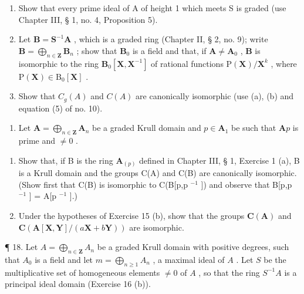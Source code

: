 \begin{enumerate}
\def\labelenumi{(\alph{enumi})}
\item
  Show that every prime ideal of A of height 1 which meets S is graded (use Chapter III, § 1, no. 4, Proposition 5).
\item
  Let \(\mathbf{B} = \mathbf{S}^{-1}\mathbf{A}\) , which is a graded ring (Chapter II, § 2, no. 9); write \(\mathbf{B} = \bigoplus_{n\in \mathbf{Z}}\mathbf{B}_n\) ; show that \(\mathbf{B}_0\) is a field and that, if \(\mathbf{A}\neq \mathbf{A}_0\) , \(\mathbf{B}\) is isomorphic to the ring \(\mathbf{B}_0[\mathbf{X},\mathbf{X}^{-1}]\) of rational functions \(\mathrm{P}(\mathbf{X}) / \mathbf{X}^k\) , where \(\mathrm{P}(\mathbf{X})\in \mathrm{B}_0[\mathbf{X}]\) .
\item
  Show that \(C_{g}(A)\) and \(C(A)\) are canonically isomorphic (use (a), (b) and equation (5) of no. 10).
\end{enumerate}

\begin{enumerate}
\def\labelenumi{\arabic{enumi}.}
\setcounter{enumi}{16}
\tightlist
\item
  Let \(\mathbf{A} = \bigoplus_{n\in \mathbf{Z}}\mathbf{A}_n\) be a graded Krull domain and \(p\in \mathbf{A}_1\) be such that \(\mathbf{A}p\) is prime and \(\neq 0\) .
\end{enumerate}

\begin{enumerate}
\def\labelenumi{(\alph{enumi})}
\item
  Show that, if B is the ring \(\mathbf{A}_{(p)}\) defined in Chapter III, § 1, Exercise 1 (a), B is a Krull domain and the groups C(A) and C(B) are canonically isomorphic. (Show first that C(B) is isomorphic to C(B{[}p,p \(^{-1}\) {]}) and observe that B{[}p,p \(^{-1}\) {]} = A{[}p \(^{-1}\) {]}.)
\item
  Under the hypotheses of Exercise 15 (b), show that the groups \(\mathbf{C}(\mathbf{A})\) and \(\mathbf{C}(\mathbf{A}[\mathbf{X},\mathbf{Y}] / (a\mathbf{X} + b\mathbf{Y}))\) are isomorphic.
\end{enumerate}

¶ 18. Let \(A = \bigoplus_{n \in \mathbf{Z}} A_n\) be a graded Krull domain with positive degrees, such that \(A_0\) is a field and let \(m = \bigoplus_{n \geqslant 1} A_n\) , a maximal ideal of \(A\) . Let \(S\) be the multiplicative set of homogeneous elements \(\neq 0\) of \(A\) , so that the ring \(S^{-1}A\) is a principal ideal domain (Exercise 16 (b)).

